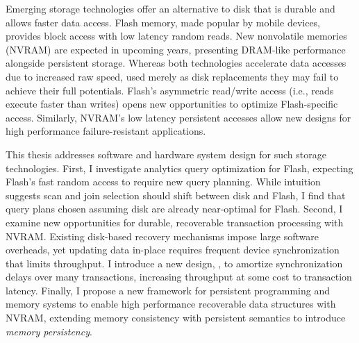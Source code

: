 Emerging storage technologies offer an alternative to disk that is durable and allows faster data access.
Flash memory, made popular by mobile devices, provides block access with low latency random reads.
New nonvolatile memories (NVRAM) are expected in upcoming years, presenting DRAM-like performance alongside persistent storage.
Whereas both technologies accelerate data accesses due to increased raw speed, used merely as disk replacements they may fail to achieve their full potentials.
Flash's asymmetric read/write access (i.e., reads execute faster than writes) opens new opportunities to optimize Flash-specific access.
Similarly, NVRAM's low latency persistent accesses allow new designs for high performance failure-resistant applications.

This thesis addresses software and hardware system design for such storage technologies.
First, I investigate analytics query optimization for Flash, expecting Flash's fast random access to require new query planning.
While intuition suggests scan and join selection should shift between disk and Flash, I find that query plans chosen assuming disk are already near-optimal for Flash.
Second, I examine new opportunities for durable, recoverable transaction processing with NVRAM.
Existing disk-based recovery mechanisms impose large software overheads, yet updating data in-place requires frequent device synchronization that limits throughput.
I introduce a new design, \GroupCommit, to amortize synchronization delays over many transactions, increasing throughput at some cost to transaction latency.
Finally, I propose a new framework for persistent programming and memory systems to enable high performance recoverable data structures with NVRAM, extending memory consistency with persistent semantics to introduce \emph{memory persistency}.
